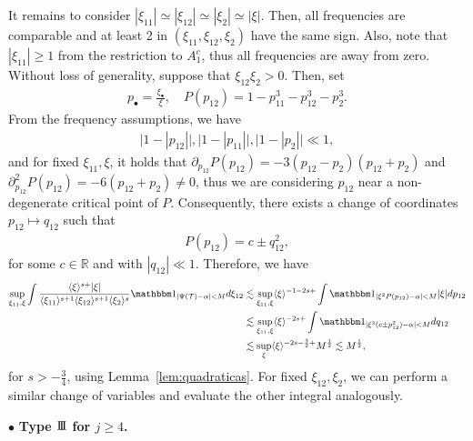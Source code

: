 \documentclass[%
11pt,  reqno]{amsart}
\newcommand{\III}{\textup{I \hspace{-2.9mm} I \hspace{-2.9mm} I}}
\newcommand{\5}{\textup{V}}
\newcommand{\noi}{\noindent}
\newcommand{\ind}{\mathbbm 1}
\newcommand{\les}{\lesssim}
\theoremstyle{remark}
\newcommand{\R}{\mathbb{R}}
\newcommand{\bul}{\bullet}
\newcommand{\TT}{\mathcal{T}}
\newcommand{\al}{\alpha}
\newcommand{\jb}[1]
{\langle #1 \rangle}
\numberwithin{equation}{section}
\numberwithin{theorem}{section}
\begin{document}
It remains to consider $|\xi_{11}| \simeq |\xi_{12}| \simeq |\xi_2| \simeq |\xi|$. Then, all frequencies are comparable and at least 2 in $(\xi_{11}, \xi_{12}, \xi_2)$ have the same sign.
Also, note that $|\xi_{11}| \ge 1$ from the restriction to $A_1^c$, thus all frequencies are away from zero. 
Without loss of generality, suppose that $\xi_{12} \xi_2 >0$. Then, set
\begin{align}
    p_\bul = \frac{\xi_\bul}{\xi}, \quad P(p_{12}) = 1 - p_{11}^3 - p_{12}^3 - p_2^3. 
\end{align}
From the frequency assumptions, we have
\begin{align} 
    \big| 1 - |p_{12}| \big| , 
    \big| 1 - |p_{11}| \big| , 
    \big| 1 - |p_{2}| \big| \ll 1, 
\end{align}
and for fixed $\xi_{11}, \xi$, it holds that $\partial_{p_{12}} P(p_{12}) = -3 (p_{12} - p_2) (p_{12} + p_2) $ and $\partial^2_{p_{12}}P(p_{12}) = -6 (p_{12} + p_2) \ne 0$, thus we are considering $p_{12}$ near a non-degenerate critical point of $P$. Consequently, there exists a change of coordinates $p_{12} \mapsto q_{12}$ such that
\begin{align}
    P(p_{12}) = c \pm q_{12}^2, 
\end{align}
for some $c\in\R$ 
and with $|q_{12}| \ll 1$. Therefore, we have
\begin{align}
\sup_{\xi_{11}, \xi} \int 
\frac{\jb{\xi}^{s+} |\xi|  }{ \jb{\xi_{11}}^{s+1} \jb{\xi_{12}}^{s+1} \jb{\xi_{2}}^s}
    \ind_{|\Psi(\TT)- \al | < M } d\xi_{12}
    &
    \les \sup_{\xi_{11}, \xi} 
    \jb{\xi}^{-1-2s+} 
    \int \ind_{|\xi^2P(p_{12}) - \al | < M } |\xi| d p_{12} 
    \\
    &
    \les \sup_{\xi_{11}, \xi} 
    \jb{\xi}^{-2s+}
    \int \ind_{|\xi^3(c \pm p_{12}^2) - \al| < M} dq_{12}
    \\
    &
    \les \sup_\xi \jb{\xi}^{-2s - \frac32 + } M^\frac12 \les M^\frac12, 
\end{align}
for $s>-\frac34$, using Lemma~\ref{lem:quadraticas}. For fixed $\xi_{12}, \xi_2$, we can perform a similar change of variables and evaluate the other integral analogously. 


\smallskip
\noi
$\bul$ \textbf{Type $\III$ for $j\ge 4$.}
\end{document}
